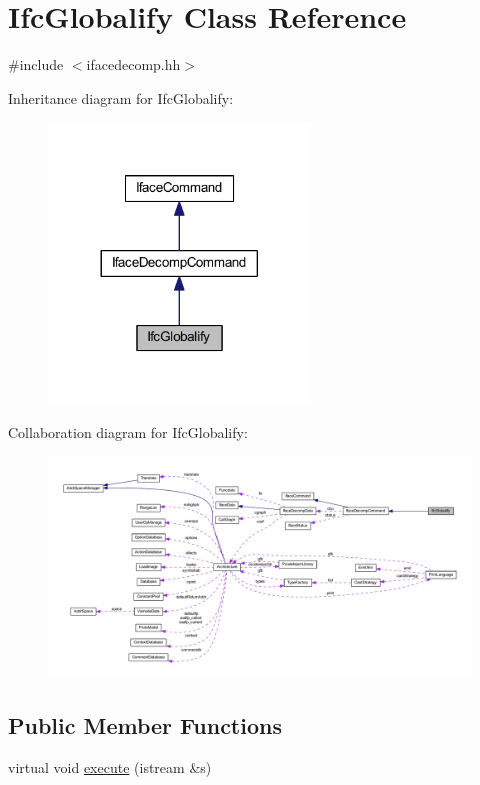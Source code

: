 \hypertarget{class_ifc_globalify}{}\section{Ifc\+Globalify Class Reference}
\label{class_ifc_globalify}


{\ttfamily \#include $<$ifacedecomp.\+hh$>$}



Inheritance diagram for Ifc\+Globalify\+:
\nopagebreak
\begin{figure}[H]
\begin{center}
\leavevmode
\includegraphics[width=197pt]{class_ifc_globalify__inherit__graph}
\end{center}
\end{figure}


Collaboration diagram for Ifc\+Globalify\+:
\nopagebreak
\begin{figure}[H]
\begin{center}
\leavevmode
\includegraphics[width=350pt]{class_ifc_globalify__coll__graph}
\end{center}
\end{figure}
\subsection*{Public Member Functions}
\begin{DoxyCompactItemize}
\item 
virtual void \mbox{\hyperlink{class_ifc_globalify_a30fe295b7731c4161efb170abbd90c10}{execute}} (istream \&s)
\end{DoxyCompactItemize}
